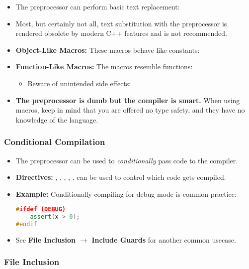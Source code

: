 \documentclass{article}
\begin{document}
\begin{itemize}
	\item The preprocessor can perform basic text replacement:
	\item Most, but certainly not all, text substitution with the preprocessor is rendered obsolete by modern C++ features and is not recommended.
	\item \textbf{Object-Like Macros:} These macros behave like constants:
	\item\textbf{Function-Like Macros:} The macros resemble functions:
	\begin{itemize}
		\item Beware of unintended side effects:
	\end{itemize}
	\item \textbf{The preprocessor is dumb but the compiler is smart.} When using macros, keep in mind that you are offered no type safety, and they have no knowledge of the language.
\end{itemize}

\subsubsection{Conditional Compilation}

\begin{itemize}
	\item The preprocessor can be used to \textit{conditionally} pass code to the compiler.
	\item \textbf{Directives:} , , , , ,  can be used to control which code gets compiled.
	\item \textbf{Example:} Conditionally compiling for debug mode is common practice:
\begin{lstlisting}[language=C++]
#ifdef (DEBUG)
	assert(x > 0);
#endif
\end{lstlisting}
	\item See \textbf{File Inclusion $\rightarrow$ Include Guards} for another common usecase.
	\end{itemize}

\subsubsection{File Inclusion}
\end{document}
